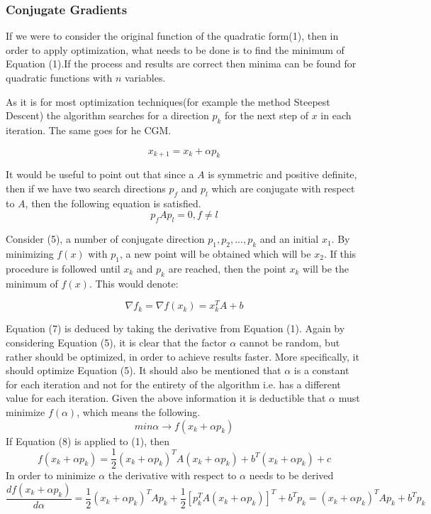 \documentclass[12pt,a4paper]{article}
\begin{document}
\subsubsection{Conjugate Gradients\cite{press2007numerical}\cite{shewchuk1994introduction}\cite{cgm2009lec}}
If we were to consider the original function of the quadratic form(1), then in order to apply optimization, what needs to be done is to find the minimum of Equation (1).If the process and results are correct then minima can be found for quadratic functions with $n$ variables.

As it is for most optimization techniques(for example the method Steepest Descent\cite{rosenbloom1956method}) the algorithm searches for a direction $p_k$ for the next step of $x$ in each iteration. The same goes for he CGM.

\begin{equation}
x_{k+1}=x_k+\alpha p_k
\end{equation}

It would be useful to point out that since a $A$ is symmetric and positive definite, then if we have two search directions $p_f$ and $p_{l}$ which are conjugate with respect to $A$, then the following equation is satisfied.\cite{rast2012managing}
\begin{equation}
p_fAp_l=0, f\neq l
\end{equation}

Consider (5), a number of conjugate direction $p_1,p_2,...,p_{k}$ and an initial $x_1$. By minimizing $f(x)$ with $p_1$, a new point will be obtained which will be $x_2$. If this procedure is followed until $x_k$ and $p_k$ are reached, then the point $x_k$ will be the minimum of $f(x)$. This would denote:

\begin{equation}
\nabla f_k=\nabla f(x_k)=x_k^TA+b
\end{equation}

Equation (7) is deduced by taking the derivative from Equation (1). Again by considering Equation (5), it is clear that the factor $\alpha$ cannot be random, but rather should be optimized, in order to achieve results faster. More specifically, it should optimize Equation (5). It should also be mentioned that $\alpha$ is a constant for each iteration and not for the entirety of the algorithm i.e. has a different value for each iteration. Given the above information it is deductible that $\alpha$ must minimize $f(\alpha)$, which means the following.
\begin{equation}
min \alpha \to f(x_k+\alpha p_k)
\end{equation}
If Equation (8) is applied to (1), then
\begin{equation}
f(x_k+\alpha p_k)=\frac{1}{2}(x_k+\alpha p_k)^TA(x_k+\alpha p_k)+b^T(x_k+\alpha p_k) + c
\end{equation}
In order to minimize $\alpha$ the derivative with respect to $\alpha$ needs to be derived
\begin{equation}
\frac{df(x_k+\alpha p_k)}{d\alpha}=\frac{1}{2}(x_k+\alpha p_k)^TAp_k+\frac{1}{2}[p_k^TA(x_k+\alpha p_k)]^T+b^Tp_k=(x_k+\alpha p_k)^TAp_k+b^Tp_k
\end{equation}
\end{document}
